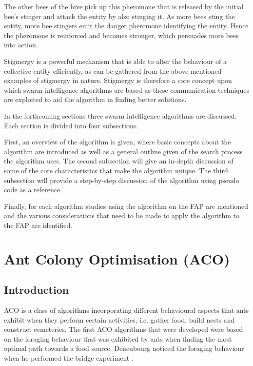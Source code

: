 The other bees of the hive pick up this pheromone that is released by the initial bee's stinger and attack the entity by also stinging it\cite{stigmergicoptimization}. As more bees sting the entity, more bee stingers emit the danger pheromone identifying the entity\cite{stigmergicoptimization}. Hence the pheromone is reinforced and becomes stronger, which persuades more bees into action\cite{stigmergicoptimization}.

Stigmergy is a powerful mechanism that is able to alter the behaviour of a collective entity efficiently, as can be gathered from the above-mentioned examples of stigmergy in nature\cite{AntsAndStigmergy,CompuIntelligenceIntro,AntIntroTrends}. Stigmergy is therefore a core concept upon which swarm intelligence algorithms are based as these communication techniques are exploited to aid the algorithm in finding better solutions\cite{AntsAndStigmergy,CompuIntelligenceIntro,AntIntroTrends}.

In the forthcoming sections three swarm intelligence algorithms are discussed. Each section is divided into four subsections. 

First, an overview of the algorithm is given, where basic concepts about the algorithm are introduced as well as a general outline given of the search process the algorithm uses. 
The second subsection will give an in-depth discussion of some of the core characteristics that make the algorithm unique. 
The third subsection will provide a step-by-step discussion of the algorithm using pseudo code as a reference.

Finally, for each algorithm studies using the algorithm on the \gls{FAP} are mentioned and the various considerations that need to be made to apply the algorithm to the \gls{FAP} are identified.

\section{Ant Colony Optimisation (ACO)}
\label{sec:ACO}
\subsection{Introduction}
\label{sec:ACOverview}
ACO is a class of algorithms incorporating different behavioural aspects that ants exhibit when they perform certain activities, i.e. gather food, build nests and construct cemeteries\cite{AntsAndStigmergy,CompuIntelligenceIntro}. The first \gls{ACO} algorithms that were developed were based on the foraging behaviour that was exhibited by ants when finding the most optimal path towards a food source. Deneubourg noticed the foraging behaviour when he performed the bridge experiment \cite{AntsAndStigmergy,CompuIntelligenceIntro}.

